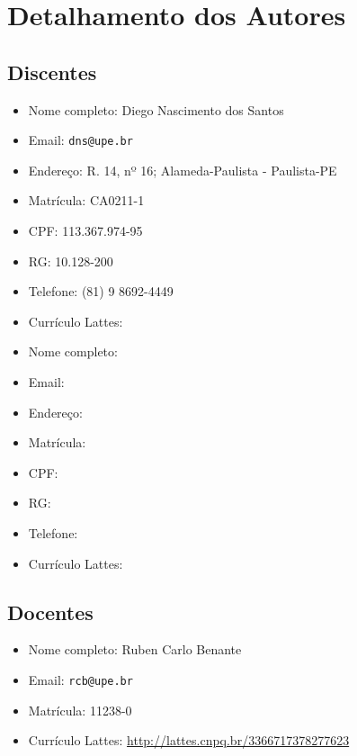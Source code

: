 \documentclass[a4paper,12pt]{article}
\begin{document}
\section{Detalhamento dos Autores}

\subsection{Discentes}

\begin{itemize}
    \item Nome completo: Diego Nascimento dos Santos
    \item Email: \texttt{dns@upe.br}
    \item Endereço: R. 14, nº 16; Alameda-Paulista - Paulista-PE
    \item Matrícula: CA0211-1
    \item CPF: 113.367.974-95
    \item RG: 10.128-200
    \item Telefone: (81) 9 8692-4449
    \item Currículo Lattes:
\end{itemize}

\begin{itemize}
    \item Nome completo:
    \item Email: \texttt{}
    \item Endereço:
    \item Matrícula:
    \item CPF:
    \item RG:
    \item Telefone:
    \item Currículo Lattes:
\end{itemize}

\subsection{Docentes}

\begin{itemize}
    \item Nome completo: Ruben Carlo Benante
    \item Email: \texttt{rcb@upe.br}
    \item Matrícula: 11238-0
    \item Currículo Lattes: \url{http://lattes.cnpq.br/3366717378277623}
\end{itemize}
\end{document}
